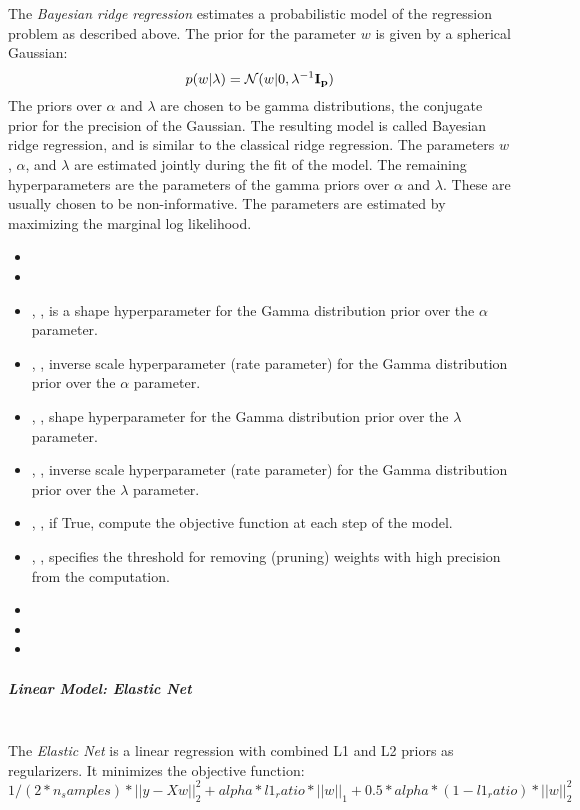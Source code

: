 The \textit{Bayesian ridge regression} estimates a probabilistic model of the
regression problem as described above.
%
The prior for the parameter $w$ is given by a spherical Gaussian:
\begin{equation}
p(w|\lambda) =\mathcal{N}(w|0,\lambda^{-1}\bold{I_{p}})
\end{equation}
The priors over $\alpha$ and $\lambda$ are chosen to be gamma distributions, the
conjugate prior for the precision of the Gaussian.
%
The resulting model is called Bayesian ridge regression, and is similar to the
classical ridge regression.
%
The parameters $w$, $\alpha$, and $\lambda$ are estimated jointly during the fit
of the model.
%
The remaining hyperparameters are the parameters of the gamma priors over
$\alpha$ and $\lambda$.
%
These are usually chosen to be non-informative.
%
The parameters are estimated by maximizing the marginal log likelihood.
%
\begin{itemize}
  \item {}
  \item {}
  \item {}, , is a shape
  hyperparameter for the Gamma distribution prior over the $\alpha$ parameter.
  \item {}, , inverse scale
  hyperparameter (rate parameter) for the Gamma distribution prior over the
  $\alpha$ parameter.
  \item {}, , shape
  hyperparameter for the Gamma distribution prior over the $\lambda$ parameter.
  \item {} , , inverse scale
  hyperparameter (rate parameter) for the Gamma distribution prior over the
  $\lambda$ parameter.
  \item {} , , if True,
  compute the objective function at each step of the model.
  \item {} , , specifies
  the threshold for removing (pruning) weights with high precision from the
  computation.
  \item {}
  \item {}
  \item \verDescriptionA
\end{itemize}
\subparagraph{Linear Model: Elastic Net}
\mbox{}
\\The \textit{Elastic Net} is a linear regression with combined L1 and L2 priors
as regularizers.
%
It minimizes the objective function:
\begin{equation}
1/(2*n_samples) *||y - Xw||^2_2+alpha*l1_ratio*||w||_1 + 0.5 *alpha*(1 - l1_ratio)*||w||^2_2
\end{equation}

